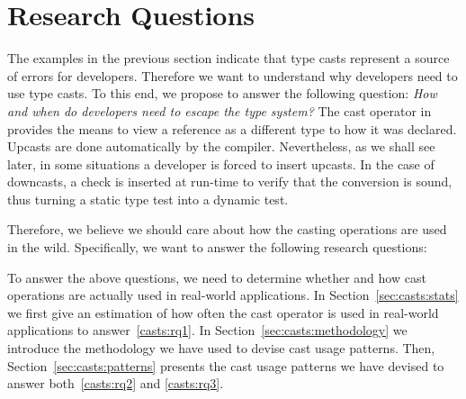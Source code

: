 \section{Research Questions}

The examples in the previous section indicate that type casts represent a source of errors for developers.
Therefore we want to understand why developers need to use type casts.
To this end, we propose to answer the following question:
\emph{How and when do developers need to escape the type system?}
The cast operator in \java{} provides the means to view a reference as a different type to how it was declared.
Upcasts are done automatically by the compiler.
Nevertheless, as we shall see later, in some situations a developer is forced to insert upcasts.
In the case of downcasts,
a check is inserted at run-time to verify that the conversion is sound,
thus turning a static type test into a dynamic test.

Therefore, we believe we should care about how the casting operations are used in the wild.
Specifically, we want to answer the following research questions:



To answer the above questions, we need to determine whether and how cast operations are actually used in real-world \java{} applications.
In Section~\ref{sec:casts:stats} we first give an estimation of how often the cast operator is used in real-world applications to answer~\ref{casts:rq1}.
In Section~\ref{sec:casts:methodology} we introduce the methodology we have used to devise cast usage patterns.
Then, Section~\ref{sec:casts:patterns} presents the cast usage patterns we have devised to answer both~\ref{casts:rq2} and \ref{casts:rq3}.
